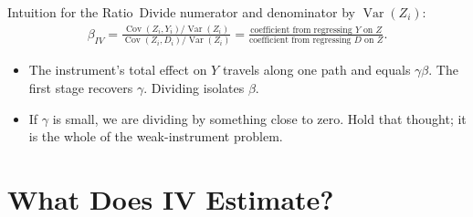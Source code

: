 \documentclass[aspectratio=169,11pt,xcolor=dvipsnames]{beamer}
\DeclareMathOperator{\Cov}{Cov}
\DeclareMathOperator{\Var}{Var}
\newcommand{\core}{\,\raisebox{0.6pt}{\textcolor{corestar}{$\bigstar$}}}
\begin{document}
\begin{frame}{Intuition for the Ratio\core}
Divide numerator and denominator by $\Var(Z_i)$:
\begin{align*}
  \beta_{IV}
  = \frac{\Cov(Z_i,Y_i)/\Var(Z_i)}{\Cov(Z_i,D_i)/\Var(Z_i)}
  = \frac{\text{coefficient from regressing } Y \text{ on } Z}
         {\text{coefficient from regressing } D \text{ on } Z} .
\end{align*}
\begin{center}
\end{center}
\vskip-6pt
\begin{itemize}\itemsep2pt
  \item The instrument's total effect on $Y$ travels along one path and equals
        $\gamma\beta$. The first stage recovers $\gamma$. Dividing isolates
        $\beta$.
  \item \alert{If $\gamma$ is small, we are dividing by something close to zero.}
        Hold that thought; it is the whole of the weak-instrument problem.
\end{itemize}
\end{frame}

\section[LATE]{What Does IV Estimate?}
\begin{frame}\sectionpage\end{frame}
\end{document}

